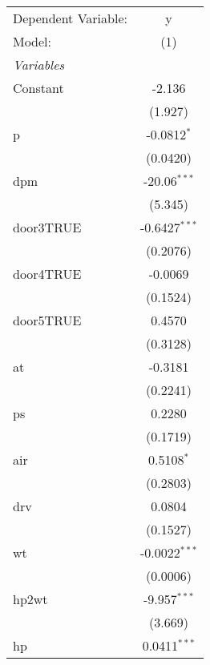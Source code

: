 
\begingroup
\centering
\begin{tabular}{lc}
   \tabularnewline \midrule \midrule
   Dependent Variable:            & y\\  
   Model:                         & (1)\\  
   \midrule
   \emph{Variables}\\
   Constant                       & -2.136\\   
                                  & (1.927)\\   
   p                              & -0.0812$^{*}$\\   
                                  & (0.0420)\\   
   dpm                            & -20.06$^{***}$\\   
                                  & (5.345)\\   
   door3TRUE                      & -0.6427$^{***}$\\   
                                  & (0.2076)\\   
   door4TRUE                      & -0.0069\\   
                                  & (0.1524)\\   
   door5TRUE                      & 0.4570\\   
                                  & (0.3128)\\   
   at                             & -0.3181\\   
                                  & (0.2241)\\   
   ps                             & 0.2280\\   
                                  & (0.1719)\\   
   air                            & 0.5108$^{*}$\\   
                                  & (0.2803)\\   
   drv                            & 0.0804\\   
                                  & (0.1527)\\   
   wt                             & -0.0022$^{***}$\\   
                                  & (0.0006)\\   
   hp2wt                          & -9.957$^{***}$\\   
                                  & (3.669)\\   
   hp                             & 0.0411$^{***}$\\   

\end{tabular}
